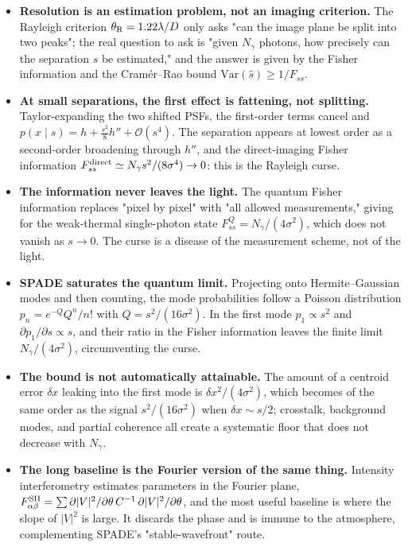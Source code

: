 \begin{itemize}
  \item \textbf{Resolution is an estimation problem, not an imaging criterion.} The Rayleigh criterion $\theta_{\rm R}=1.22\lambda/D$ only asks "can the image plane be split into two peaks"; the real question to ask is "given $N_\gamma$ photons, how precisely can the separation $s$ be estimated," and the answer is given by the Fisher information and the Cramér--Rao bound $\mathrm{Var}(\hat s)\ge1/F_{ss}$.
  \item \textbf{At small separations, the first effect is fattening, not splitting.} Taylor-expanding the two shifted PSFs, the first-order terms cancel and $p(x\mid s)=h+\tfrac{s^2}{8}h''+\mathcal O(s^4)$. The separation appears at lowest order as a second-order broadening through $h''$, and the direct-imaging Fisher information $F_{ss}^{\rm direct}\simeq N_\gamma s^2/(8\sigma^4)\to0$: this is the Rayleigh curse.
  \item \textbf{The information never leaves the light.} The quantum Fisher information replaces "pixel by pixel" with "all allowed measurements," giving for the weak-thermal single-photon state $F_{ss}^{Q}=N_\gamma/(4\sigma^2)$, which does not vanish as $s\to0$. The curse is a disease of the measurement scheme, not of the light.
  \item \textbf{SPADE saturates the quantum limit.} Projecting onto Hermite--Gaussian modes and then counting, the mode probabilities follow a Poisson distribution $p_n=e^{-Q}Q^n/n!$ with $Q=s^2/(16\sigma^2)$. In the first mode $p_1\propto s^2$ and $\partial p_1/\partial s\propto s$, and their ratio in the Fisher information leaves the finite limit $N_\gamma/(4\sigma^2)$, circumventing the curse.
  \item \textbf{The bound is not automatically attainable.} The amount of a centroid error $\delta x$ leaking into the first mode is $\delta x^2/(4\sigma^2)$, which becomes of the same order as the signal $s^2/(16\sigma^2)$ when $\delta x\sim s/2$; crosstalk, background modes, and partial coherence all create a systematic floor that does not decrease with $N_\gamma$.
  \item \textbf{The long baseline is the Fourier version of the same thing.} Intensity interferometry estimates parameters in the Fourier plane, $F^{\rm SII}_{\alpha\beta}=\sum\partial|V|^2/\partial\theta\,C^{-1}\,\partial|V|^2/\partial\theta$, and the most useful baseline is where the slope of $|V|^2$ is large. It discards the phase and is immune to the atmosphere, complementing SPADE's "stable-wavefront" route.
\end{itemize}


